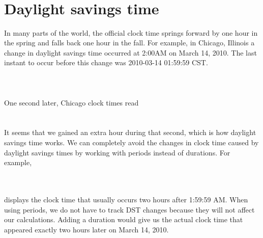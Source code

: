 \documentclass[article]{jss}
\begin{document}
\\
\\
\\
\\


\section{Daylight savings time}
\label{sec:DST}

In many parts of the world, the official clock time springs forward by one hour in the spring and falls back one hour in the fall. For example, in Chicago, Illinois a change in daylight savings time occurred at 2:00AM on March 14, 2010. The last instant to occur before this change was 2010-03-14 01:59:59 CST.\\

\\
\\
\\

One second later, Chicago clock times read\\

\\
\\

It seems that we gained an extra hour during that second, which is how daylight savings time works. We can completely avoid the changes in clock time caused by daylight savings times by working with periods instead of durations. For example,\

\\
\\

displays the clock time that usually occurs two hours after 1:59:59 AM. When using periods, we do not have to track DST changes because they will not affect our calculations. Adding a duration would give us the actual clock time that appeared exactly two hours later on March 14, 2010.

\\
\\
\end{document}
